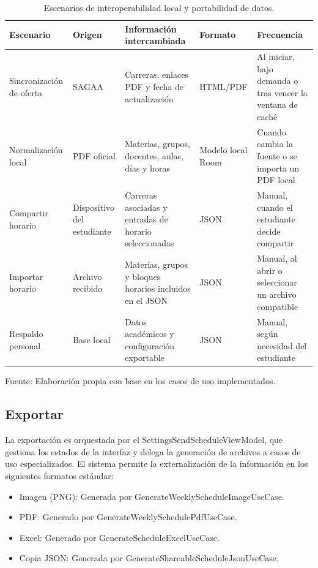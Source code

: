 \begin{table}[H]
\centering
\begin{tabularx}{\linewidth}{@{}p{3.2cm} p{2.6cm} p{3.1cm} p{2.4cm} p{2.7cm}@{}}
\toprule
Escenario & Origen & Información intercambiada & Formato & Frecuencia \\
\midrule
Sincronización de oferta & SAGAA & Carreras, enlaces PDF y fecha de actualización & HTML/PDF & Al iniciar, bajo demanda o tras vencer la ventana de caché \\
Normalización local & PDF oficial & Materias, grupos, docentes, aulas, días y horas & Modelo local Room & Cuando cambia la fuente o se importa un PDF local \\
Compartir horario & Dispositivo del estudiante & Carreras asociadas y entradas de horario seleccionadas & JSON & Manual, cuando el estudiante decide compartir \\
Importar horario & Archivo recibido & Materias, grupos y bloques horarios incluidos en el JSON & JSON & Manual, al abrir o seleccionar un archivo compatible \\
Respaldo personal & Base local & Datos académicos y configuración exportable & JSON & Manual, según necesidad del estudiante \\
\bottomrule
\end{tabularx}
\caption{Escenarios de interoperabilidad local y portabilidad de datos.}\label{tab:f5_escenarios_interoperabilidad}
Fuente: Elaboración propia con base en los casos de uso implementados.
\end{table}

\subsection{Exportar}
La exportación es orquestada por el SettingsSendScheduleViewModel, que gestiona los estados de la interfaz y delega la generación de archivos a casos de uso especializados. El sistema permite la externalización de la información en los siguientes formatos estándar:
\begin{itemize}
  \item Imagen (PNG): Generada por GenerateWeeklyScheduleImageUseCase.
  \item PDF: Generado por GenerateWeeklySchedulePdfUseCase.
  \item Excel: Generado por GenerateScheduleExcelUseCase.
  \item Copia JSON: Generada por GenerateShareableScheduleJsonUseCase.
\end{itemize}

